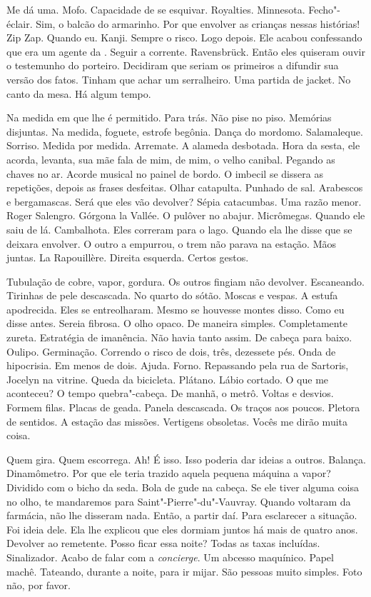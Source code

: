 Me dá uma. Mofo. Capacidade de se esquivar. Royalties. Minnesota.
Fecho"-éclair. Sim, o balcão do armarinho. Por que envolver as crianças
nessas histórias! Zip Zap. Quando eu. Kanji. Sempre o risco. Logo
depois. Ele acabou confessando que era um agente da . Seguir a
corrente. Ravensbrück. Então eles quiseram ouvir o testemunho do
porteiro. Decidiram que seriam os primeiros a difundir sua versão dos
fatos. Tinham que achar um serralheiro. Uma partida de jacket. No canto
da mesa. Há algum tempo.

Na medida em que lhe é permitido. Para trás. Não pise no piso. Memórias
disjuntas. Na medida, foguete, estrofe begônia. Dança do mordomo.
Salamaleque. Sorriso. Medida por medida. Arremate. A alameda desbotada.
Hora da sesta, ele acorda, levanta, sua mãe fala de mim, de mim, o velho
canibal. Pegando as chaves no ar. Acorde musical no painel de bordo. O
imbecil se dissera as repetições, depois as frases desfeitas. Olhar
catapulta. Punhado de sal. Arabescos e bergamascas. Será que eles vão
devolver? Sépia catacumbas. Uma razão menor. Roger Salengro. Górgona la
Vallée. O pulôver no abajur. Micrômegas. Quando ele saiu de lá.
Cambalhota. Eles correram para o lago. Quando ela lhe disse que se
deixara envolver. O outro a empurrou, o trem não parava na estação. Mãos
juntas. La Rapouillère. Direita esquerda. Certos gestos.

Tubulação de cobre, vapor, gordura. Os outros fingiam não devolver.
Escaneando. Tirinhas de pele descascada. No quarto do sótão. Moscas e
vespas. A estufa apodrecida. Eles se entreolharam. Mesmo se houvesse
montes disso. Como eu disse antes. Sereia fibrosa. O olho opaco. De
maneira simples. Completamente zureta. Estratégia de imanência. Não
havia tanto assim. De cabeça para baixo. Oulipo. Germinação. Correndo o
risco de dois, três, dezessete pés. Onda de hipocrisia. Em menos de
dois. Ajuda. Forno. Repassando pela rua de Sartoris, Jocelyn na vitrine.
Queda da bicicleta. Plátano. Lábio cortado. O que me aconteceu? O tempo
quebra"-cabeça. De manhã, o metrô. Voltas e desvios. Formem filas. Placas
de geada. Panela descascada. Os traços aos poucos. Pletora de sentidos.
A estação das missões. Vertigens obsoletas. Vocês me dirão muita coisa.

Quem gira. Quem escorrega. Ah! É isso. Isso poderia dar ideias a outros.
Balança. Dinamômetro. Por que ele teria trazido aquela pequena máquina a
vapor? Dividido com o bicho da seda. Bola de gude na cabeça. Se ele
tiver alguma coisa no olho, te mandaremos para Saint"-Pierre"-du"-Vauvray.
Quando voltaram da farmácia, não lhe disseram nada. Então, a partir daí.
Para esclarecer a situação. Foi ideia dele. Ela lhe explicou que eles
dormiam juntos há mais de quatro anos. Devolver ao remetente. Posso
ficar essa noite? Todas as taxas incluídas. Sinalizador. Acabo de falar
com a \emph{concierge}. Um abcesso maquínico. Papel machê. Tateando,
durante a noite, para ir mijar. São pessoas muito simples. Foto não, por
favor.

